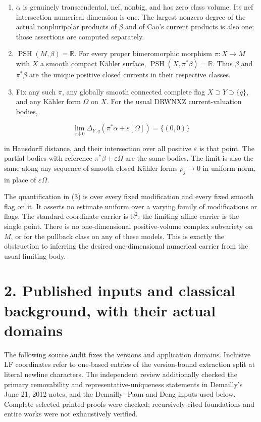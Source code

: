 \documentclass[11pt]{article}
\begin{document}
\begin{enumerate}
\item[1.] $\alpha$ is genuinely transcendental, nef, nonbig, and has zero class volume. Its nef intersection numerical dimension is one. The largest nonzero degree of the actual nonpluripolar products of $\beta$ and of Cao's current products is also one; those assertions are computed separately.
\item[2.] $\operatorname{PSH}(M,\beta)=\mathbb R$. For every proper bimeromorphic morphism $\pi:X\to M$ with $X$ a smooth compact Kähler surface, $\operatorname{PSH}(X,\pi^*\beta)=\mathbb R$. Thus $\beta$ and $\pi^*\beta$ are the unique positive closed currents in their respective classes.
\item[3.] Fix any such $\pi$, any globally smooth connected complete flag $X\supset Y\supset\{q\}$, and any Kähler form $\Omega$ on $X$. For the usual DRWNXZ current-\allowbreak{}valuation bodies,

\end{enumerate}
\[\lim_{\varepsilon\downarrow0}\Delta_{Y,q}(\pi^*\alpha+\varepsilon[\Omega])=\{(0,0)\}\]

in Hausdorff distance, and their intersection over all positive $\varepsilon$ is that point. The partial bodies with reference $\pi^*\beta+\varepsilon\Omega$ are the same bodies. The limit is also the same along any sequence of smooth closed Kähler forms $\rho_j\to0$ in uniform norm, in place of $\varepsilon\Omega$.

The quantification in (3) is over every fixed modification and every fixed smooth flag on it. It asserts no estimate uniform over a varying family of modifications or flags. The standard coordinate carrier is $\mathbb R^2$; the limiting affine carrier is the single point. There is no one-\allowbreak{}dimensional positive-\allowbreak{}volume complex subvariety on $M$, or for the pullback class on any of these models. This is exactly the obstruction to inferring the desired one-\allowbreak{}dimensional numerical carrier from the usual limiting body.

\section*{2. Published inputs and classical background, with their actual domains}

The following source audit fixes the versions and application domains. Inclusive LF coordinates refer to one-\allowbreak{}based entries of the version-\allowbreak{}bound extraction split at literal newline characters. The independent review additionally checked the primary removability and representative-\allowbreak{}uniqueness statements in Demailly's June 21, 2012 notes, and the Demailly-\allowbreak{}-\allowbreak{}Paun and Deng inputs used below. Complete selected printed proofs were checked; recursively cited foundations and entire works were not exhaustively verified.
\end{document}
